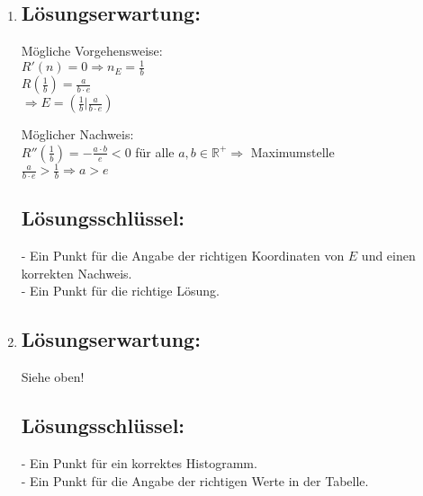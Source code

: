 \begin{langesbeispiel}
{\begin{enumerate}
Mögliche Interpretation:\\
Im gegebenen Kontext gibt $n_0$ denjenigen Lachsbestand an, bei dem die Anzahl der Lachse der Nachfolgegeneration unverändert bleibt.

\subsection{Lösungsschlüssel:}

- Ein Punkt für die richtige Lösung.\\
Toleranzintervall für den Lachsbestand: $[547;548]$\\
- Ein Ausgleichspunkt für eine korrekte Interpretation.

\item \subsection{Lösungserwartung:}

Mögliche Vorgehensweise:\\
$R'(n)=0 \Rightarrow n_E=\frac{1}{b}$\\
$R\left(\frac{1}{b}\right)=\frac{a}{b\cdot e}$\\
$\Rightarrow E=\left(\frac{1}{b}\big|\frac{a}{b\cdot e}\right)$

Möglicher Nachweis:\\
$R''\left(\frac{1}{b}\right)=-\frac{a\cdot b}{e}<0$ für alle $a, b\in\mathbb{R}^+ \Rightarrow$ Maximumstelle\\
$\frac{a}{b\cdot e}>\frac{1}{b} \Rightarrow a>e$

\subsection{Lösungsschlüssel:}
- Ein Punkt für die Angabe der richtigen Koordinaten von $E$ und einen korrekten Nachweis.\\
- Ein Punkt für die richtige Lösung.

\item \subsection{Lösungserwartung:}

Siehe oben!


\subsection{Lösungsschlüssel:}
- Ein Punkt für ein korrektes Histogramm.\\
- Ein Punkt für die Angabe der richtigen Werte in der Tabelle.


\end{enumerate}}
\end{langesbeispiel}